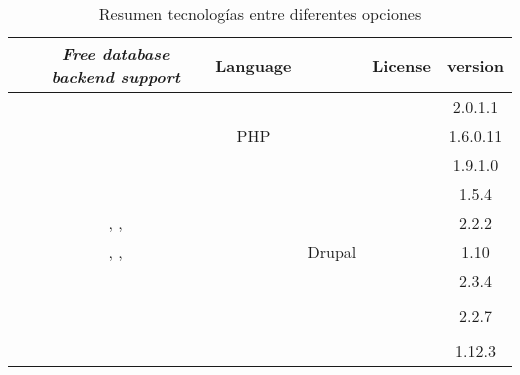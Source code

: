 \begin{table}[H]
    \tiny
    \centering
\begin{tabular}{ |l|c|c|c|c|c| }

\hline
	&
	\textit{Free database backend support}&
	Language&
	\textit{\gloss{waf}}&
	License&
	version

\\ \hline
	\nameOpenCart &
	\mysql&
	\php&
	&
	\gplthreelicense &
	2.0.1.1
	
\\ \hline
	\namePrestaShop &
	\mysql&
	PHP&
	&
	\opslicense &
	1.6.0.11
	
\\ \hline
	\nameMagento &
	\mysql&
	\php&
	\nameZendFramework \cite{online_zend_framework}&
	\opslicense &
	1.9.1.0
	
\\ \hline
	\nameZenCart &
	\mysql&
	\php&
	&
	\gpllicense &
	1.5.4
 
\\ \hline
	\nameSpreeCommerce &
	\mysql, \postgresql, \sqlitethree&
	\ruby \cite{online_ruby_language}&
	\rubyonrails \cite{online_ruby_rails}&
	\bsdthreelicense&
	2.2.2

\\ \hline
	\nameDrupalCommerce &
	\mysql, \postgresql, \sqlitethree&
	\php&
	Drupal\cite{online_drupal}&
	\gpllicense &
	1.10
	
\\ \hline
	\nameOsCommerce &
	\mysql&
	\php&
	&
	\gpllicense &
	2.3.4

\\ \hline
	\nameSimpleCart &
	&
	&
	&
	&
	
\\ \hline
	\nameWooCommerce &
	\mysql&
	\php&
	\wordPress \cite{online_wordpress}&
	\gpllicense &
	2.2.7
	
\\ \hline
	\nameWPECommerce &
	&
	&
	&
	&
	
\\ \hline
	\nameJigoshop &
	\mysql&
	\php&
	\wordPress \cite{online_wordpress}&
	\gpllicense &
	1.12.3
	
\\ \hline
\end{tabular}
    \caption{ Resumen tecnologías entre diferentes opciones \ecommerce}
    \label{tab:resume_technology_ecommerce}
\end{table}




